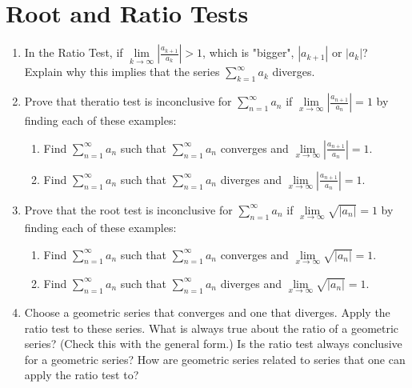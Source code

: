 \section{Root and Ratio Tests}
\begin{enumerate}

\item In the Ratio Test, if $
\mathop {\lim }\limits_{k \to \infty } \left| {\frac{{a_{k + 1} }}{{a_k }}} \right| > 1$, which is "bigger", $\left| {a_{k + 1} } \right|$ or $\left| {a_k } \right|$?  Explain why this implies that the series $\displaystyle\sum\limits_{k = 1}^\infty  {a_k } $ diverges.  \cite{SM}

\item Prove that theratio test is inconclusive for $
\displaystyle\sum\limits_{n = 1}^\infty  {a_n } $ if $\mathop {\lim }\limits_{x \to \infty } \left| {\frac{{a_{n + 1} }}{{a_n }}} \right| = 1$ by finding each of these examples: 
\begin{enumerate}
\item Find $\displaystyle\sum\limits_{n = 1}^\infty  {a_n } $ such that $\displaystyle\sum\limits_{n = 1}^\infty  {a_n } $ converges and $
\mathop {\lim }\limits_{x \to \infty } \left| {\frac{{a_{n + 1} }}{{a_n }}} \right| = 1$.  \item Find $\displaystyle\sum\limits_{n = 1}^\infty  {a_n } 
$ such that $
\displaystyle\sum\limits_{n = 1}^\infty  {a_n } $ diverges and $
\mathop {\lim }\limits_{x \to \infty } \left| {\frac{{a_{n + 1} }}{{a_n }}} \right| = 1$.
\end{enumerate}

\item Prove that the root test is inconclusive for $
\displaystyle\sum\limits_{n = 1}^\infty  {a_n } $ if $\mathop {\lim }\limits_{x \to \infty } \sqrt {\left| {a_n } \right|}  = 1$
 by finding each of these examples:
\begin{enumerate} 
\item Find $\displaystyle\sum\limits_{n = 1}^\infty  {a_n } $ such that $
\displaystyle\sum\limits_{n = 1}^\infty  {a_n } $ converges and $
\mathop {\lim }\limits_{x \to \infty } \sqrt {\left| {a_n } \right|}  = 1$.
\item Find $\displaystyle\sum\limits_{n = 1}^\infty  {a_n } $
such that $\displaystyle\sum\limits_{n = 1}^\infty  {a_n } 
$ diverges and $\mathop {\lim }\limits_{x \to \infty } \sqrt {\left| {a_n } \right|}  = 1$. 
\end{enumerate}

\item Choose a geometric series that converges and one that diverges.  Apply the ratio test to these series.  What is always true about the ratio of a geometric series?  (Check this with the general form.)  Is the ratio test always conclusive for a geometric series?  How are geometric series related to series that one can apply the ratio test to?


\end{enumerate}
